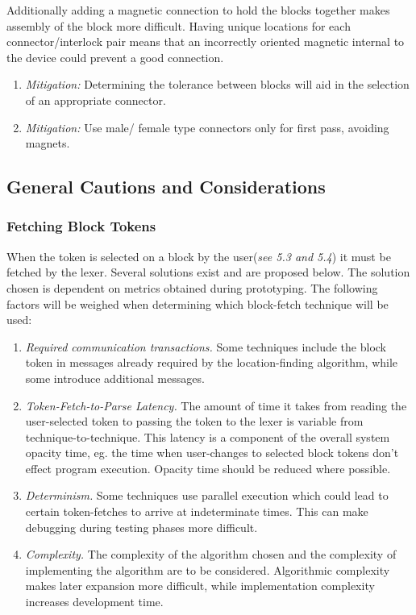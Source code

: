     Additionally adding a magnetic connection to hold the blocks together makes assembly of the block more difficult. Having unique locations for each connector/interlock pair means that an incorrectly oriented magnetic internal to the device could prevent a good connection.
    \begin{enumerate}
     \item \textit{Mitigation:} Determining the tolerance between blocks will aid in the selection of an appropriate connector.
      \item \textit{Mitigation:} Use male/ female type connectors only for first pass, avoiding magnets. 
    \end{enumerate} 


\subsection{General Cautions and Considerations}
\subsubsection{Fetching Block Tokens}
When the token is selected on a block by the user(\textit{see 5.3 and 5.4}) it must be fetched by the lexer. Several solutions exist and are proposed below. The solution chosen is dependent on metrics obtained during prototyping. The following factors will be weighed when determining which block-fetch technique will be used:
\begin{enumerate}
    \item \textit{Required communication transactions.} Some techniques include the block token in messages already required by the location-finding algorithm, while some introduce additional messages.
    \item \textit{Token-Fetch-to-Parse Latency.} The amount of time it takes from reading the user-selected token to passing the token to the lexer is variable from technique-to-technique. This latency is a component of the overall system opacity time, eg. the time when user-changes to selected block tokens don't effect program execution. Opacity time should be reduced where possible.
    \item \textit{Determinism.} Some techniques use parallel execution which could lead to certain token-fetches to arrive at indeterminate times. This can make debugging during testing phases more difficult.
    \item \textit{Complexity.} The complexity of the algorithm chosen and the complexity of implementing the algorithm are to be considered. Algorithmic complexity makes later expansion more difficult, while implementation complexity increases development time.
\end{enumerate}

